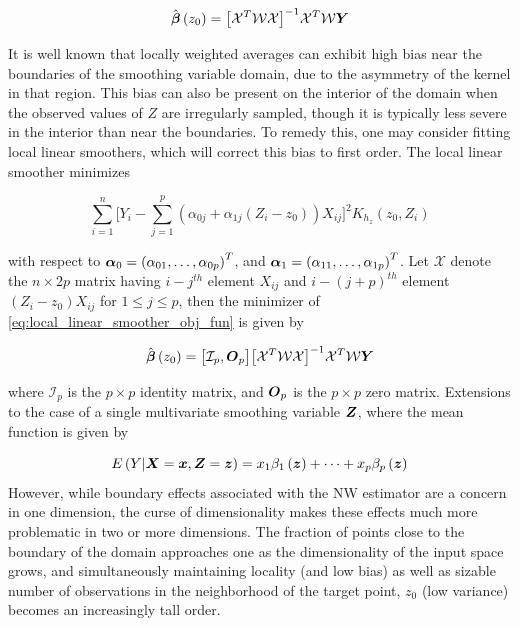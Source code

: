 \documentclass[12pt]{article}
\newcommand{\bfbeta}{\mbox{\boldmath $\beta$}}
\newcommand{\bfalpha}{\mbox{\boldmath $\alpha$}}
\newcommand{\bfO}{\mbox{\boldmath $O$}}
\newcommand{\bfx}{\mbox{\boldmath $x$}}
\newcommand{\bfX}{\mbox{\boldmath $X$}}
\newcommand{\bfz}{\mbox{\boldmath $z$}}
\newcommand{\bfY}{\mbox{\boldmath $Y$}}
\newcommand{\bfZ}{\mbox{\boldmath $Z$}}
\begin{document}
{\begin{equation} \nonumber
\hat{\bfbeta}\left(z_0\right) = \big[\mathcal{X}^T\mathcal{W}\mathcal{X}\big]^{-1} \mathcal{X}^T\mathcal{W} \bfY
\end{equation} 


It is well known that locally weighted averages can exhibit high bias near the boundaries of the smoothing variable domain, due to the asymmetry of the kernel in that region. This bias can also be present on the interior of the domain when the observed values of $Z$ are irregularly sampled, though it is typically less severe in the interior than near the boundaries. To remedy this, one may consider fitting local linear smoothers, which will correct this bias to first order. The local linear smoother minimizes 

\begin{equation} \label{local_linear_smoother_obj_fun} 
\sum_{i=1}^n \Big[Y_i - \sum_{j=1}^p \left(\alpha_{0j}+\alpha_{1j}\left(Z_i - z_0 \right)\right)X_{ij}\Big]^2 K_{h_z}\left(z_0,Z_i\right)
\end{equation} 
 
 \noindent
 with respect to $\bfalpha_0 = \left( \alpha_{01}, \dots, \alpha_{0p}\right)^T$, and $\bfalpha_1 = \left( \alpha_{11}, \dots, \alpha_{1p}\right)^T$. Let $\mathcal{X}$ denote the $n \times 2p$ matrix having $i-j^{th}$ element $X_{ij}$ and $i-\left(j+p\right)^{th}$ element $\left(Z_i - z_0\right)X_{ij}$ for $1 \le  j \le p$, then the minimizer of \ref{eq:local_linear_smoother_obj_fun} is given by 
 
\begin{equation} \nonumber
\hat{\bfbeta}\left(z_0\right) = \big[ \mathcal{I}_p, \bfO_p \big]\big[\mathcal{X}^T\mathcal{W}\mathcal{X}\big]^{-1} \mathcal{X}^T\mathcal{W} \bfY
\end{equation}   

\noindent
where $\mathcal{I}_p$ is the $p \times p$ identity matrix, and $\bfO_p$ is the $p \times p$ zero matrix. Extensions to the case of a single multivariate smoothing variable $\bfZ$, where the mean function is given by 

\[
E\left(Y \vert \bfX=\bfx, \bfZ=\bfz \right) = x_1\beta_1\left(\bfz\right) + \dots  + x_p\beta_p\left(\bfz\right)
\]
\noindent
However, while boundary effects associated with the NW estimator are a concern in one dimension, the curse of dimensionality makes these effects much more problematic in two or more dimensions. The fraction of points close to the boundary of the domain approaches one as the dimensionality of the input space grows, and simultaneously maintaining locality (and low bias) as well as sizable number of observations in the neighborhood of the target point, $z_0$ (low variance) becomes an increasingly tall order. 

}
\end{document}
